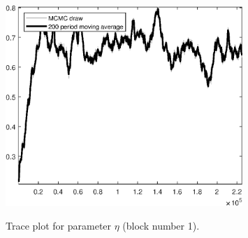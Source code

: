 \begin{figure}[H]
\centering
  \includegraphics[width=0.8\textwidth]{BRS_sectoral/graphs/TracePlot_eta_blck_1}\\
    \caption{Trace plot for parameter ${\eta}$ (block number 1).}
\end{figure}
